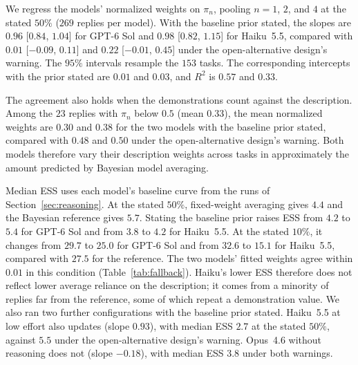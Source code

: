 \documentclass{article}
\theoremstyle{definition}
\begin{document}
We regress the models' normalized weights on $\pi_n$, pooling $n=1$, $2$, and $4$ at the stated $50\%$ ($269$ replies per model). With the baseline prior stated, the slopes are $0.96$ [$0.84$, $1.04$] for GPT-6 Sol and $0.98$ [$0.82$, $1.15$] for Haiku~5.5, compared with $0.01$ [$-0.09$, $0.11$] and $0.22$ [$-0.01$, $0.45$] under the open-alternative design's warning. The $95\%$ intervals resample the $153$ tasks. The corresponding intercepts with the prior stated are $0.01$ and $0.03$, and $R^2$ is $0.57$ and $0.33$.

The agreement also holds when the demonstrations count against the description. Among the $23$ replies with $\pi_n$ below $0.5$ (mean $0.33$), the mean normalized weights are $0.30$ and $0.38$ for the two models with the baseline prior stated, compared with $0.48$ and $0.50$ under the open-alternative design's warning. Both models therefore vary their description weights across tasks in approximately the amount predicted by Bayesian model averaging.

Median ESS uses each model's baseline curve from the runs of Section~\ref{sec:reasoning}. At the stated $50\%$, fixed-weight averaging gives $4.4$ and the Bayesian reference gives $5.7$. Stating the baseline prior raises ESS from $4.2$ to $5.4$ for GPT-6 Sol and from $3.8$ to $4.2$ for Haiku~5.5. At the stated $10\%$, it changes from $29.7$ to $25.0$ for GPT-6 Sol and from $32.6$ to $15.1$ for Haiku~5.5, compared with $27.5$ for the reference. The two models' fitted weights agree within $0.01$ in this condition (Table~\ref{tab:fallback}). Haiku's lower ESS therefore does not reflect lower average reliance on the description; it comes from a minority of replies far from the reference, some of which repeat a demonstration value. We also ran two further configurations with the baseline prior stated. Haiku~5.5 at low effort also updates (slope $0.93$), with median ESS $2.7$ at the stated $50\%$, against $5.5$ under the open-alternative design's warning. Opus~4.6 without reasoning does not (slope $-0.18$), with median ESS $3.8$ under both warnings.
\end{document}
